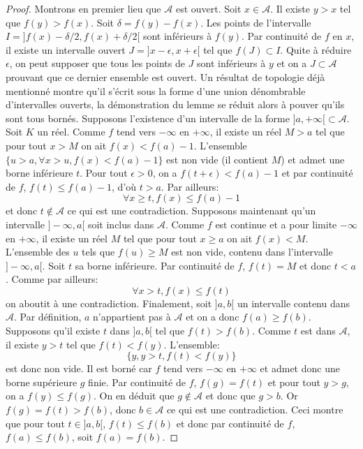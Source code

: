 \begin{proof}
Montrons en premier lieu que $\mathcal{A}$ est ouvert. Soit $x \in \mathcal{A}$.
Il existe $y > x$ tel que $f(y) > f(x)$. Soit $\delta = f(y)-f(x)$.
Les points de l'intervalle $I=]f(x)-\delta/2, f(x)+\delta/2[$ sont inférieurs à
$f(y)$. Par continuité de $f$ en $x$, il existe un intervalle ouvert
$J=]x-\epsilon, x+\epsilon[$ tel que $f(J) \subset I$. Quite à réduire
$\epsilon$, on peut supposer que tous les points de $J$ sont inférieurs à $y$ et
on a $J \subset \mathcal{A}$ prouvant que ce dernier ensemble est ouvert. Un
résultat de topologie déjà mentionné montre qu'il s'écrit sous la forme d'une
union dénombrable d'intervalles ouverts, la démonstration du lemme se réduit
alors à pouver qu'ils sont tous bornés. Supposons l'existence d'un intervalle
de la forme $]a,+\infty[ \subset \mathcal{A}$. Soit $K$ un réel. Comme $f$ tend
vers $-\infty$ en $+\infty$, il existe un réel $M>a$ tel que pour tout $x > M$ on ait $f(x) <
f(a)-1$. L'ensemble $\{ u > a, \forall x > u, f(x) < f(a)-1\}$ est non vide (il
contient $M$) et admet une borne inférieure $t$. Pour tout $\epsilon > 0$, on a
$f(t+\epsilon) < f(a) - 1$  et par continuité de $f$, $f(t) \leq f(a)-1$, d'où
$t> a$. Par ailleurs:
\[
\forall x \geq t, f(x) \leq f(a)-1
\] 
et donc $t \notin \mathcal{A}$ ce qui est une
contradiction.
Supposons maintenant qu'un intervalle $]-\infty, a[$ soit inclus dans
$\mathcal{A}$. Comme $f$ est continue et a pour limite $-\infty$ en $+\infty$,
il existe un réel $M$ tel que pour tout $x \geq a$ on ait $f(x) < M$. L'ensemble
des $u$ tels que $f(u) \geq M$ est non vide, contenu dans l'intervalle
$]-\infty, a[$. Soit $t$ sa borne inférieure. Par continuité de $f$, $f(t) = M$
et donc $t < a$. Comme par ailleurs:
\[
\forall x > t, f(x) \leq f(t) 
\]
on aboutit à une contradiction.
Finalement, soit $]a,b[$ un intervalle contenu dans $\mathcal{A}$. Par
définition, $a$ n'appartient pas à $\mathcal{A}$ et on a donc $f(a) \geq f(b)$.
Supposons qu'il existe $t$ dans $]a,b[$ tel que $f(t) > f(b)$. Comme $t$ est
dans $\mathcal{A}$, il existe $y > t$ tel que $f(t) < f(y)$. L'ensemble:
\[
\{ y , y > t, f(t) < f(y) \}
\]
est donc non vide. Il est borné car $f$ tend vers $-\infty$ en $+\infty$ et
admet donc une borne supérieure $g$ finie. Par continuité de $f$, $f(g)=f(t)$ et
pour tout $y > g$, on a $f(y) \leq f(g)$. On en déduit que $g \notin
\mathcal{A}$ et donc que $g > b$. Or $f(g)=f(t)> f(b)$, donc $b \in \mathcal{A}$
ce qui est une contradiction. Ceci montre que pour tout $t \in ]a,b[$, $f(t)
\leq f(b)$ et donc par continuité de $f$, $f(a) \leq f(b)$, soit $f(a)=f(b)$.
 \end{proof}
